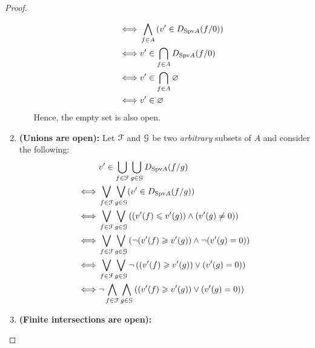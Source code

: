 \begin{proof}
\begin{enumerate}
\begin{enumerate}
$$\begin{aligned}
                                                    \iff & \bigwedge_{f \in A} \left(v' \in D_{\mathrm{Spv} A}(f/0)\right)
                                                    \\
                                                    \iff & v' \in \bigcap_{f \in A} D_{\mathrm{Spv} A}(f/0)
                                                    \\
                                                    \iff & v' \in \bigcap_{f \in A} \varnothing
                                                    \\
                                                    \iff & v' \in \varnothing
                                                \end{aligned}
                                            $$
                                        Hence, the empty set is also open.
                                    \end{enumerate}
                                \item \textbf{(Unions are open):} Let $\mathcal{F}$ and $\mathcal{G}$ be two \textit{arbitrary} subsets of $A$ and consider the following:
                                    $$
                                        \begin{aligned}
                                            & v' \in \bigcup_{f \in \mathcal{F}} \bigcup_{g \in \mathcal{G}} D_{\mathrm{Spv} A}(f/g)
                                            \\
                                            \iff & \bigvee_{f \in \mathcal{F}} \bigvee_{g \in \mathcal{G}} (v' \in D_{\mathrm{Spv} A}(f/g))
                                            \\
                                            \iff & \bigvee_{f \in \mathcal{F}} \bigvee_{g \in \mathcal{G}} \left((v'(f) \leqslant v'(g)) \wedge (v'(g) \not = 0)\right)
                                            \\
                                            \iff & \bigvee_{f \in \mathcal{F}} \bigvee_{g \in \mathcal{G}} \left(\neg(v'(f) \geqslant v'(g)) \wedge \neg(v'(g) = 0)\right)
                                            \\
                                            \iff & \bigvee_{f \in \mathcal{F}} \bigvee_{g \in \mathcal{G}} \neg \left((v'(f) \geqslant v'(g)) \vee (v'(g) = 0)\right)
                                            \\
                                            \iff & \neg \bigwedge_{f \in \mathcal{F}} \bigwedge_{g \in \mathcal{G}} \left((v'(f) \geqslant v'(g)) \vee (v'(g) = 0)\right)
                                        \end{aligned}
                                    $$
                                \item \textbf{(Finite intersections are open):}
                            \end{enumerate}
                    \end{proof}

